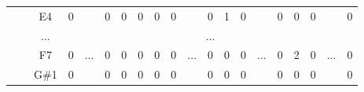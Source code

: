 \documentclass[12pt]{article}
\begin{document}
\begin{table}[!ht]
{\begin{tabular}{clcccccccccccccccccc}
                       & \multicolumn{1}{l|}{} & \multicolumn{1}{c|}{E4}   & \multicolumn{1}{c|}{0}    & \multicolumn{1}{c|}{}                     & \multicolumn{1}{c|}{0}    & \multicolumn{1}{c|}{0}    & \multicolumn{1}{c|}{0}    & \multicolumn{1}{c|}{0}    & \multicolumn{1}{c|}{0}  & \multicolumn{1}{c|}{}                     & \multicolumn{1}{c|}{0}    & \multicolumn{1}{c|}{1}    & \multicolumn{1}{c|}{0}    & \multicolumn{1}{c|}{}                     & \multicolumn{1}{c|}{0}  & \multicolumn{1}{c|}{0}  & \multicolumn{1}{c|}{0}  & \multicolumn{1}{c|}{}                     & \multicolumn{1}{c|}{0}  \\ \cline{3-4} \cline{6-10} \cline{12-14} \cline{16-18} \cline{20-20} 
                       & \multicolumn{1}{l|}{} & \multicolumn{1}{c|}{...}  & \multicolumn{17}{c|}{...}                                                                                                                                                                                                                                                                                                                                                                                                                                                                                                                       \\ \cline{3-4} \cline{6-10} \cline{12-14} \cline{16-18} \cline{20-20} 
                       & \multicolumn{1}{l|}{} & \multicolumn{1}{c|}{F7}   & \multicolumn{1}{c|}{0}    & \multicolumn{1}{c|}{...}                  & \multicolumn{1}{c|}{0}    & \multicolumn{1}{c|}{0}    & \multicolumn{1}{c|}{0}    & \multicolumn{1}{c|}{0}    & \multicolumn{1}{c|}{0}  & \multicolumn{1}{c|}{...}                  & \multicolumn{1}{c|}{0}    & \multicolumn{1}{c|}{0}    & \multicolumn{1}{c|}{0}    & \multicolumn{1}{c|}{...}                  & \multicolumn{1}{c|}{0}  & \multicolumn{1}{c|}{2}  & \multicolumn{1}{c|}{0}  & \multicolumn{1}{c|}{...}                  & \multicolumn{1}{c|}{0}  \\ \cline{3-4} \cline{6-10} \cline{12-14} \cline{16-18} \cline{20-20} 
                       & \multicolumn{1}{l|}{} & \multicolumn{1}{c|}{G\#1} & \multicolumn{1}{c|}{0}    & \multicolumn{1}{c|}{}                     & \multicolumn{1}{c|}{0}    & \multicolumn{1}{c|}{0}    & \multicolumn{1}{c|}{0}    & \multicolumn{1}{c|}{0}    & \multicolumn{1}{c|}{0}  & \multicolumn{1}{c|}{}                     & \multicolumn{1}{c|}{0}    & \multicolumn{1}{c|}{0}    & \multicolumn{1}{c|}{0}    & \multicolumn{1}{c|}{}                     & \multicolumn{1}{c|}{0}  & \multicolumn{1}{c|}{0}  & \multicolumn{1}{c|}{0}  & \multicolumn{1}{c|}{}                     & \multicolumn{1}{c|}{0}  \\ \cline{3-4} \cline{6-10} \cline{12-14} \cline{16-18} \cline{20-20} 

\end{tabular}}
\end{table}
\end{document}
